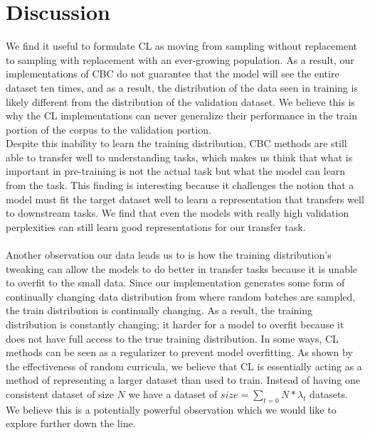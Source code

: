 \section{Discussion}
We find it useful to formulate CL as moving from sampling without replacement to sampling with replacement with an ever-growing population. As a result, our implementations of CBC do not guarantee that the model will see the entire dataset ten times, and as a result, the distribution of the data seen in training is likely different from the distribution of the validation dataset.
We believe this is why the CL implementations can never generalize their performance in the train portion of the corpus to the validation portion. \\
Despite this inability to learn the training distribution, CBC methods are still able to transfer well to understanding tasks, which makes us think that what is important in pre-training is not the actual task but what the model can learn from the task. This finding is interesting because it challenges the notion that a model must fit the target dataset well to learn a representation that transfers well to downstream tasks. We find that even the models with really high validation perplexities can still learn good representations for our transfer task. \\ \\
Another observation our data leads us to is how the training distribution's tweaking can allow the models to do better in transfer tasks because it is unable to overfit to the small data. Since our implementation generates some form of continually changing data distribution from where random batches are sampled, the train distribution is continually changing. As a result, the training distribution is constantly changing; it harder for a model to overfit because it does not have full access to the true training distribution. In some ways, CL methods can be seen as a regularizer to prevent model overfitting. As shown by the effectiveness of random curricula, we believe that CL is essentially acting as a method of representing a larger dataset than used to train. Instead of having one consistent dataset of size $N$ we have a dataset of $size = \sum_{t=0} N * \lambda_t$ datasets. We believe this is a potentially powerful observation which we would like to explore further down the line.  \\
